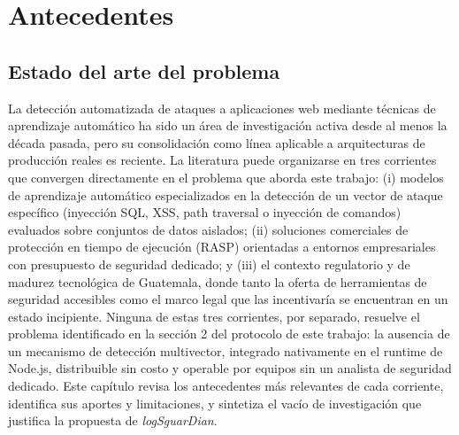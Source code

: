 \ifdefined\modoensamble
\else
	
\fi

\chapter{Antecedentes}

\section{Estado del arte del problema}
La detección automatizada de ataques a aplicaciones web mediante técnicas de aprendizaje
automático ha sido un área de investigación activa desde al menos la década pasada, pero su
consolidación como línea aplicable a arquitecturas de producción reales es reciente. La literatura
puede organizarse en tres corrientes que convergen directamente en el problema que aborda este
trabajo: (i) modelos de aprendizaje automático especializados en la detección de un vector de
ataque específico (inyección SQL, XSS, path traversal o inyección de comandos) evaluados sobre
conjuntos de datos aislados; (ii) soluciones comerciales de protección en tiempo de ejecución
(RASP) orientadas a entornos empresariales con presupuesto de seguridad dedicado; y (iii) el
contexto regulatorio y de madurez tecnológica de Guatemala, donde tanto la oferta de herramientas
de seguridad accesibles como el marco legal que las incentivaría se encuentran en un estado
incipiente. Ninguna de estas tres corrientes, por separado, resuelve el problema identificado en la
sección 2 del protocolo de este trabajo: la ausencia de un mecanismo de detección multivector,
integrado nativamente en el runtime de Node.js, distribuible sin costo y operable por equipos sin
un analista de seguridad dedicado. Este capítulo revisa los antecedentes más relevantes de cada
corriente, identifica sus aportes y limitaciones, y sintetiza el vacío de investigación que justifica la
propuesta de \textit{logSguarDian}.

